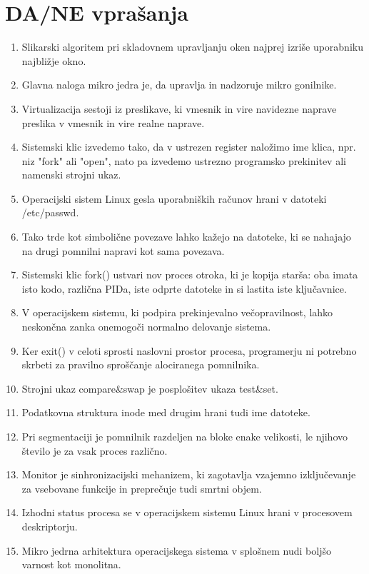 \documentclass{book}
\begin{document}
\section{DA/NE vprašanja}
\begin{enumerate}
    \item Slikarski algoritem pri skladovnem upravljanju oken najprej izriše uporabniku najbližje okno.
    \item Glavna naloga mikro jedra je, da upravlja in nadzoruje mikro gonilnike.
    \item Virtualizacija sestoji iz preslikave, ki vmesnik in vire navidezne naprave preslika v vmesnik in vire realne naprave.
    \item Sistemski klic izvedemo tako, da v ustrezen register naložimo ime klica, npr. niz "fork" ali "open", nato pa izvedemo ustrezno programsko prekinitev ali namenski strojni ukaz.
    \item Operacijski sistem Linux gesla uporabniških računov hrani v datoteki /etc/passwd.
    \item Tako trde kot simbolične povezave lahko kažejo na datoteke, ki se nahajajo na drugi pomnilni napravi kot sama povezava.
    \item Sistemski klic fork() ustvari nov proces otroka, ki je kopija starša: oba imata isto kodo, različna PIDa, iste odprte datoteke in si lastita iste ključavnice.
    \item V operacijskem sistemu, ki podpira prekinjevalno večopravilnost, lahko neskončna zanka onemogoči normalno delovanje sistema.
    \item Ker exit() v celoti sprosti naslovni prostor procesa, programerju ni potrebno skrbeti za pravilno sproščanje alociranega pomnilnika.
    \item Strojni ukaz compare\&swap je posplošitev ukaza test\&set.
    \item Podatkovna struktura inode med drugim hrani tudi ime datoteke.
    \item Pri segmentaciji je pomnilnik razdeljen na bloke enake velikosti, le njihovo število je za vsak proces različno.
    \item Monitor je sinhronizacijski mehanizem, ki zagotavlja vzajemno izključevanje za vsebovane funkcije in preprečuje tudi smrtni objem.
    \item Izhodni status procesa se v operacijskem sistemu Linux hrani v procesovem deskriptorju.
    \item Mikro jedrna arhitektura operacijskega sistema v splošnem nudi boljšo varnost kot monolitna.

\end{enumerate}
\end{document}
